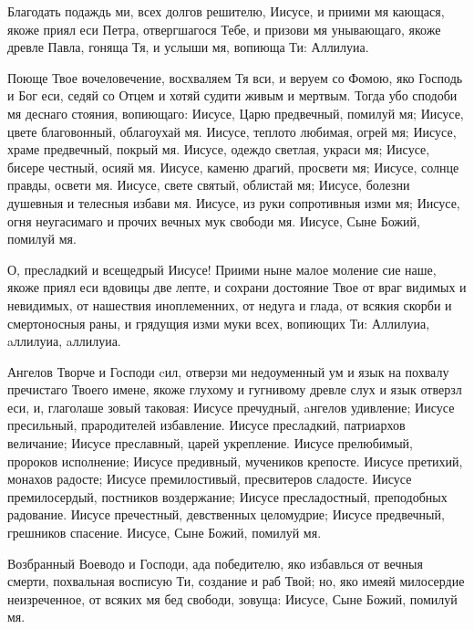 

Благодать
подаждь ми, всех долгов решителю, Иисусе, и приими мя кающася, якоже приял еси Петра, отвергшагося Тебе, и призови мя унывающаго, якоже древле Павла, гоняща Тя, и услыши мя, вопиюща Ти: Аллилуиа.




Поюще
Твое вочеловечение, восхваляем Тя вси, и веруем со Фомою, яко Господь и Бог еси, седяй со Отцем и хотяй судити живым и мертвым. Тогда убо сподоби мя деснаго стояния, вопиющаго: Иисусе, Царю предвечный, помилуй мя; Иисусе, цвете благовонный, облагоухай мя. Иисусе, теплото любимая, огрей мя; Иисусе, храме предвечный, покрый мя. Иисусе, одеждо светлая, украси мя; Иисусе, бисере честный, осияй мя. Иисусе, каменю драгий, просвети мя; Иисусе, солнце правды, освети мя. Иисусе, свете святый, облистай мя; Иисусе, болезни душевныя и телесныя избави мя. Иисусе, из руки сопротивныя изми мя; Иисусе, огня неугасимаго и прочих вечных мук свободи мя. Иисусе, Сыне Божий, помилуй мя. 




О,
пресладкий и всещедрый Иисусе! Приими ныне малое моление сие наше, якоже приял еси вдовицы две лепте, и сохрани достояние Твое от враг видимых и невидимых, от нашествия иноплеменних, от недуга и глада, от всякия скорби и смертоносныя раны, и грядущия изми муки всех, вопиющих Ти: Аллилуиа, aллилуиа, aллилуиа.






Ангелов
Творче и Господи cил, отверзи ми недоуменный ум и язык на похвалу пречистаго Твоего имене, якоже глухому и гугнивому древле слух и язык отверзл еси, и, глаголаше зовый таковая: Иисусе пречудный, aнгелов удивление; Иисусе пресильный, прародителей избавление. Иисусе пресладкий, патриархов величание; Иисусе преславный, царей укрепление. Иисусе прелюбимый, пророков исполнение; Иисусе предивный, мучеников крепосте. Иисусе претихий, монахов радосте; Иисусе премилостивый, пресвитеров сладосте. Иисусе премилосердый, постников воздержание; Иисусе пресладостный, преподобных радование. Иисусе пречестный, девственных целомудрие; Иисусе предвечный, грешников спасение. Иисусе, Сыне Божий, помилуй мя.




Возбранный
Воеводо и Господи, ада победителю, яко избавлься от вечныя смерти, похвальная восписую Ти, создание и раб Твой; но, яко имеяй милосердие неизреченное, от всяких мя бед свободи, зовуща: Иисусе, Сыне Божий, помилуй мя.


